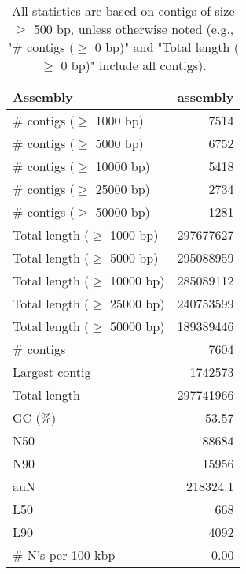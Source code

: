 \documentclass[12pt,a4paper]{article}
\begin{document}
\begin{table}[ht]
\begin{center}
\caption{All statistics are based on contigs of size $\geq$ 500 bp, unless otherwise noted (e.g., "\# contigs ($\geq$ 0 bp)" and "Total length ($\geq$ 0 bp)" include all contigs).}
\begin{tabular}{|l*{1}{|r}|}
\hline
Assembly & assembly \\ \hline
\# contigs ($\geq$ 1000 bp) & 7514 \\ \hline
\# contigs ($\geq$ 5000 bp) & 6752 \\ \hline
\# contigs ($\geq$ 10000 bp) & 5418 \\ \hline
\# contigs ($\geq$ 25000 bp) & 2734 \\ \hline
\# contigs ($\geq$ 50000 bp) & 1281 \\ \hline
Total length ($\geq$ 1000 bp) & 297677627 \\ \hline
Total length ($\geq$ 5000 bp) & 295088959 \\ \hline
Total length ($\geq$ 10000 bp) & 285089112 \\ \hline
Total length ($\geq$ 25000 bp) & 240753599 \\ \hline
Total length ($\geq$ 50000 bp) & 189389446 \\ \hline
\# contigs & 7604 \\ \hline
Largest contig & 1742573 \\ \hline
Total length & 297741966 \\ \hline
GC (\%) & 53.57 \\ \hline
N50 & 88684 \\ \hline
N90 & 15956 \\ \hline
auN & 218324.1 \\ \hline
L50 & 668 \\ \hline
L90 & 4092 \\ \hline
\# N's per 100 kbp & 0.00 \\ \hline
\end{tabular}
\end{center}
\end{table}
\end{document}
